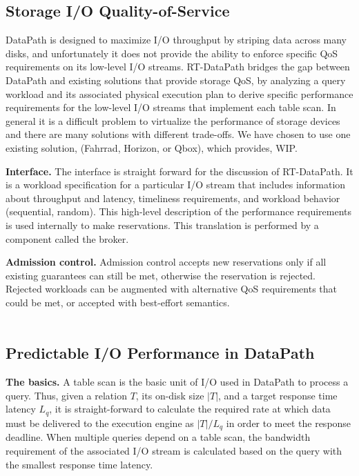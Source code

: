 \documentclass{sig-alternate}
\begin{document}
\subsection{Storage I/O Quality-of-Service}
\label{sec:ioqos}

DataPath is designed to maximize I/O throughput by striping data across many
disks, and unfortunately it does not provide the ability to enforce specific
QoS requirements on its low-level I/O streams. RT-DataPath bridges the gap
between DataPath and existing solutions that provide storage QoS, by analyzing
a query workload and its associated physical execution plan to derive specific
performance requirements for the low-level I/O streams that implement each
table scan. In general it is a difficult problem to virtualize the performance
of storage devices and there are many solutions with different trade-offs. We
have chosen to use one existing solution, (Fahrrad, Horizon, or Qbox), which
provides, WIP.

{\bf Interface.} The interface is straight forward for the discussion of
RT-DataPath. It is a workload specification for a particular I/O stream that
includes information about throughput and latency, timeliness requirements,
and workload behavior (sequential, random). This high-level description of the
performance requirements is used internally to make reservations. This
translation is performed by a component called the broker.

{\bf Admission control.} Admission control accepts new reservations only if
all existing guarantees can still be met, otherwise the reservation is
rejected. Rejected workloads can be augmented with alternative QoS
requirements that could be met, or accepted with best-effort semantics.\\\\

\subsection{Predictable I/O Performance in DataPath}
\label{sec:ioqosdp}

{\bf The basics.} A table scan is the basic unit of I/O used in DataPath to
process a query. Thus, given a relation $T$, its on-disk size $|T|$, and a
target response time latency $L_q$, it is straight-forward to calculate the
required rate at which data must be delivered to the execution engine as
$|T|/L_q$ in order to meet the response deadline. When multiple queries depend
on a table scan, the bandwidth requirement of the associated I/O stream is
calculated based on the query with the smallest response time latency.
\end{document}

